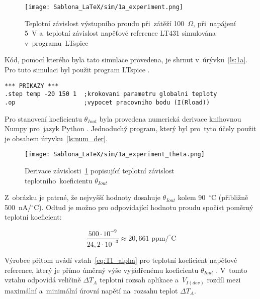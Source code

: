 \documentclass[12pt]{CLASS/protokol}
\begin{document}
        \begin{figure}[h]
            \centering
            \texttt{[image: Sablona\_LaTeX/sim/1a\_experiment.png]}
            \caption{Teplotní závislost výstupního proudu při~zátěží 100~$\Omega$, při~napájení 5~V a~teplotní závislost napěťové reference LT431 simulována v~programu~LTspice \cite{LTspice}}
            \label{fig:1a_i}
        \end{figure}
        \newpage
        \par
        Kód, pomocí kterého byla tato simulace provedena, je shrnut v~úrývku~\ref{ls:1a}. Pro tuto simulaci byl použit program LTspice \cite{LTspice}.
        \vspace{.5cm}
        \begin{lstlisting}[label=ls:1a,caption=Příkazy využity v~experimentu~1a]
*** PRIKAZY ***
.step temp -20 150 1  ;krokovani parametru globalni teploty
.op                   ;vypocet pracovniho bodu (I(Rload))
        \end{lstlisting}

        \par
        Pro stanovení koeficientu $\theta_{Iout}$ byla provedena numerická derivace knihovnou Numpy pro~jazyk Python \cite{python312,numpy224,pandas223}. Jednoduchý program, který byl pro~tyto účely použit je obsahem úryvku~\ref{ls:num_der}.
        
        \begin{figure}[]
            \centering
            \texttt{[image: Sablona\_LaTeX/sim/1a\_experiment\_theta.png]}
            \caption{Derivace závislosti~\ref{fig:1a_i} popisující teplotní závislost teplotního~koeficientu $\theta_{Iout}$}
            \label{fig:1a_theta}
        \end{figure}
        \vspace{.5cm}
        \par
        Z~obrázku je patrné, že nejvyšší hodnoty dosahuje $\theta_{Iout}$ kolem 90~$^\circ$C (přibližně 500~nA/$^\circ$C). Odtud je možno pro odpovídající hodnotu proudu spočíst poměrný teplotní koeficient:
        
        \begin{equation}
            \frac{500\cdot 10^{-9}}{24,2\cdot 10^{-3}}\approx20,661 \text{ ppm/}^\circ\text{C}
        \end{equation}

        \par
        Výrobce přitom uvádí vztah~\ref{eq:TI_alpha} pro teplotní koeficient napěťové reference, který je přímo úměrný výše vyjádřenému koeficientu $\theta_{Iout}$ \cite{TI_TL431_datasheet}. V~tomto vztahu odpovídá veličině $\Delta T_A$ teplotní rozsah aplikace a~$V_{I(dev)}$ rozdíl mezi maximální a~minimální úrovní napětí na~rozsahu teplot $\Delta T_A$.
\end{document}

